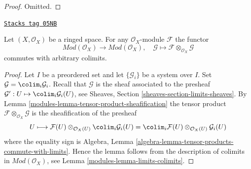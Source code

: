 \begin{proof}
Omitted.
\end{proof}

\begin{lemma}
\label{modules-lemma-tensor-commute-colimits}
\href{https://stacks.math.columbia.edu/tag/05NB}{\texttt{Stacks tag 05NB}}

Let $(X, \mathcal{O}_X)$ be a ringed space.
For any $\mathcal{O}_X$-module $\mathcal{F}$ the functor
$$
\textit{Mod}(\mathcal{O}_X) \longrightarrow \textit{Mod}(\mathcal{O}_X)
, \quad
\mathcal{G} \longmapsto \mathcal{F} \otimes_{\mathcal{O}_X} \mathcal{G}
$$
commutes with arbitrary colimits.
\end{lemma}

\begin{proof}

Let $I$ be a preordered set and let $\{\mathcal{G}_i\}$ be
a system over $I$. Set $\mathcal{G} = \colim_i \mathcal{G}_i$.
Recall that $\mathcal{G}$ is the sheaf associated to the presheaf
$\mathcal{G}' : U \mapsto \colim_i \mathcal{G}_i(U)$, see
Sheaves, Section \ref{sheaves-section-limits-sheaves}.
By
Lemma \ref{modules-lemma-tensor-product-sheafification}
the tensor product $\mathcal{F} \otimes_{\mathcal{O}_X} \mathcal{G}$
is the sheafification of the presheaf
$$
U \longmapsto
\mathcal{F}(U) \otimes_{\mathcal{O}_X(U)} \colim_i \mathcal{G}_i(U) =
\colim_i \mathcal{F}(U) \otimes_{\mathcal{O}_X(U)} \mathcal{G}_i(U)
$$
where the equality sign is
Algebra, Lemma \ref{algebra-lemma-tensor-products-commute-with-limits}.
Hence the lemma follows from the description of colimits in
$\textit{Mod}(\mathcal{O}_X)$, see Lemma \ref{modules-lemma-limits-colimits}.
\end{proof}

